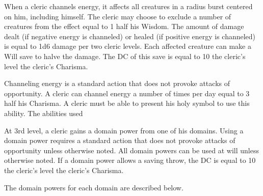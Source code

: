 When a cleric channels energy, it affects all creatures in a \areamed radius burst centered on him, including himself. The cleric may choose to exclude a number of creatures from the effect equal to 1 \add half his Wisdom. The amount of damage dealt (if negative energy is channeled) or healed (if positive energy is channeled) is equal to 1d6 damage per two cleric levels. Each affected creature can make a Will save to halve the damage. The DC of this save is equal to 10 \add the cleric's level \add the cleric's Charisma.

Channeling energy is a standard action that does not provoke attacks of opportunity. A cleric can channel energy a number of times per day equal to 3 \add half his Charisma. A cleric must be able to present his holy symbol to use this ability. The abilities used 

 At 3rd level, a cleric gains a domain power from one of his domains. Using a domain power requires a standard action that does not provoke attacks of opportunity unless otherwise noted. All domain powers can be used at will unless otherwise noted. If a domain power allows a saving throw, the DC is equal to 10 \add the cleric's level \add the cleric's Charisma.
\par The domain powers for each domain are described below.

